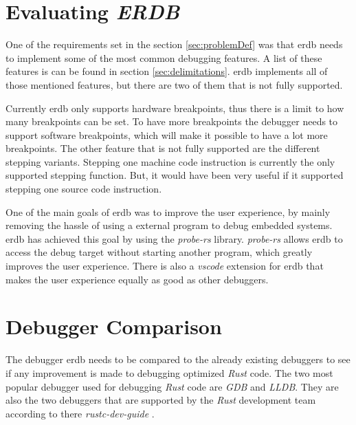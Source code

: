 \section{Evaluating \emph{ERDB}} %
One of the requirements set in the section \ref{sec:problemDef} was that \gls{erdb} needs to implement some of the most common debugging features.
A list of these features is can be found in section \ref{sec:delimitations}.
\gls{erdb} implements all of those mentioned features, but there are two of them that is not fully supported.


Currently \gls{erdb} only supports hardware breakpoints, thus there is a limit to how many breakpoints can be set.
To have more breakpoints the debugger needs to support software breakpoints, which will make it possible to have a lot more breakpoints.
The other feature that is not fully supported are the different stepping variants.
Stepping one machine code instruction is currently the only supported stepping function.
But, it would have been very useful if it supported stepping one source code instruction.


One of the main goals of \gls{erdb} was to improve the user experience, by mainly removing the hassle of using a external program to debug embedded systems.
\gls{erdb} has achieved this goal by using the \emph{probe-rs} library.
\emph{probe-rs} allows \gls{erdb} to access the debug target without starting another program, which greatly improves the user experience.
There is also a \emph{vscode} extension for \gls{erdb} that makes the user experience equally as good as other debuggers.



\section{Debugger Comparison} %
\label{sec:debuggercomparison}


The debugger \gls{erdb} needs to be compared to the already existing debuggers to see if any improvement is made to debugging optimized \emph{Rust} code.
The two most popular debugger used for debugging \emph{Rust} code are \emph{GDB} and \emph{LLDB}.
They are also the two debuggers that are supported by the \emph{Rust} development team according to there \emph{rustc-dev-guide} \cite{rust-dev-guide}.


